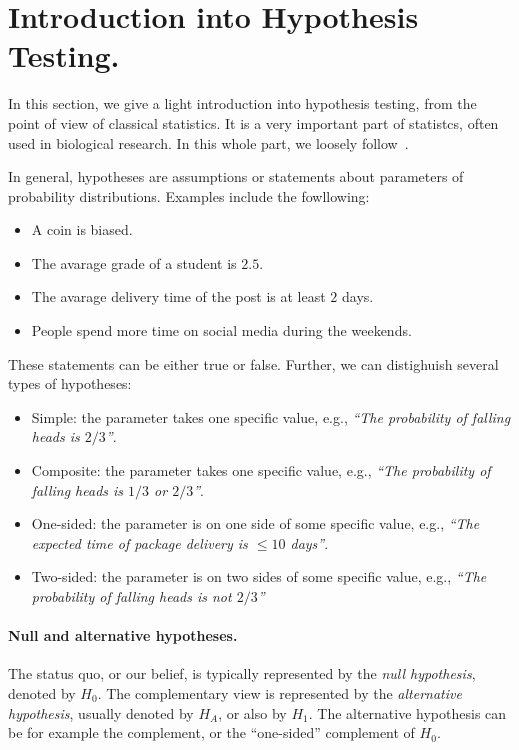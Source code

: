 



\section{Introduction into Hypothesis Testing.}
\label{pvalue}
In this section, we give a light introduction into hypothesis testing, from the point of view of classical statistics.
It is a very important part of statistcs, often used in biological research.
In this whole part, we loosely follow~\cite{citacia}.

In general, hypotheses are assumptions or statements about parameters of probability distributions.
Examples include the fowllowing:
\begin{itemize}
\item
A coin is biased.
\item
The avarage grade of a student is $2.5$.
\item
The avarage delivery time of the post is at least $2$ days.
\item
People spend more time on social media during the weekends.
\end{itemize}
These statements can be either true or false.
Further, we can distighuish several types of hypotheses:
\begin{itemize}
\item
Simple: the parameter takes one specific value, e.g., \emph{``The probability of falling heads is $2/3$''}.
\item
Composite: the parameter takes one specific value, e.g., \emph{``The probability of falling heads is $1/3$ or $2/3$''}.
\item
One-sided: the parameter is on one side of some specific value, e.g., \emph{``The expected time of package delivery is $\leq 10$ days''}.
\item
Two-sided: the parameter is on two sides of some specific value, e.g., \emph{``The probability of falling heads is not $2/3$''}
\end{itemize}

\paragraph{Null and alternative hypotheses.}
The status quo, or our belief, is typically represented by the \emph{null hypothesis}, denoted by $H_0$.
The complementary view is represented by the \emph{alternative hypothesis}, usually denoted by $H_A$, or also by $H_1$.
The alternative hypothesis can be for example the complement, or the ``one-sided'' complement of $H_0$.

